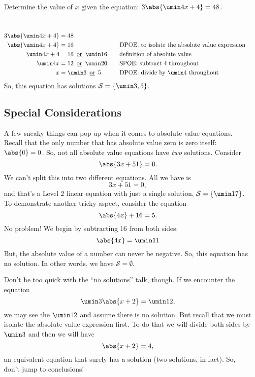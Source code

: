 \begin{boxedex}
Determine the value of $x$ given the equation: $3\abs{\umin4x+4} = 48$.

\exsoln\ 
\[\begin{aligned}
3\abs{\umin4x+4} &= 48\\
\abs{\umin4x+4} &= 16
&&\text{\quad DPOE, to isolate the absolute value expression}\\
\umin4x+4 &= 16 \OR \umin16
&&\text{\quad definition of absolute value}\\
\umin4x &= 12 \OR \umin20
&&\text{\quad SPOE: subtract 4 throughout}\\
x &= \umin3 \OR 5
&&\text{\quad DPOE: divide by $\umin4$ throughout}
\end{aligned}\]
So, this equation has solutions $\solset{\umin3, 5}$.
\end{boxedex}

\subsection{Special Considerations}

A few sneaky things can pop up when it comes to absolute value equations. Recall that the only number that has absolute value zero is zero itself: $\abs{0} = 0$. So, not all absolute value equations have \textit{two} solutions. Consider
\[\abs{3x + 51} = 0.\]
We can't split this into two different equations. All we have is
\[3x + 51 = 0,\]
and that's a Level 2 linear equation with just a single solution, $\solset{\umin17}$. To demonstrate another tricky aspect, consider the equation \[\abs{4x} + 16 = 5.\]
No problem! We begin by subtracting 16 from both sides:
\[\abs{4x} = \umin11\]
But, the absolute value of a number can never be negative. So, this equation has no solution. In other words, we have $\mathcal{S} = \emptyset$.

Don't be too quick with the ``no solutions'' talk, though. If we encounter the equation \[\umin3\abs{x + 2} = \umin12,\] we may see the $\umin12$ and assume there is no solution. But recall that we must isolate the absolute value expression first. To do that we will divide both sides by $\umin3$ and then we will have \[\abs{x+2} = 4,\] an equivalent equation that surely has a solution (two solutions, in fact). So, don't jump to conclusions!

